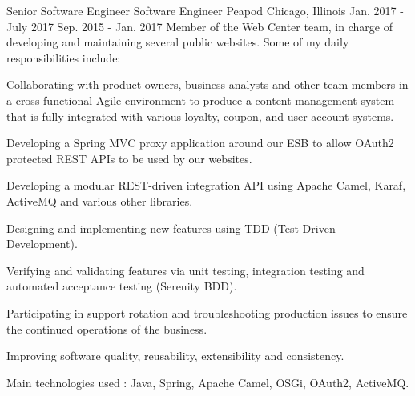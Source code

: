 \begin{cventries}
  \cventryfour
    {Senior Software Engineer} %
    {Software Engineer} %
    {Peapod} %
    {Chicago, Illinois} %
    {Jan. 2017 - July 2017} %
    {Sep. 2015 - Jan. 2017} %
    {Member of the Web Center team, in charge of developing and maintaining several public websites. Some of my daily responsibilities include:} %
    {
    \begin{cvitems}
  \item Collaborating with product owners, business analysts and other team members in a cross-functional Agile environment to produce a content management system that is fully integrated with various loyalty, coupon, and user account systems.
  \item Developing a Spring MVC proxy application around our ESB to allow OAuth2 protected REST APIs to be used by our websites.
  \item Developing a modular REST-driven integration API using Apache Camel, Karaf, ActiveMQ and various other libraries.
  \item Designing and implementing new features using TDD (Test Driven Development).
  \item Verifying and validating features via unit testing, integration testing and automated acceptance testing (Serenity BDD).
  \item Participating in support rotation and troubleshooting production issues to ensure the continued operations of the business.
  \item Improving software quality, reusability, extensibility and consistency.
  \item Main technologies used : Java, Spring, Apache Camel, OSGi, OAuth2, ActiveMQ.
\end{cvitems}
    } %


\end{cventries}
